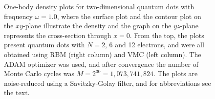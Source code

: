 \begin{figure}
	\caption{One-body density plots for two-dimensional quantum dots with frequency $\omega=1.0$, where the surface plot and the contour plot on the $xy$-plane illustrate the density and the graph on the $yz$-plane represents the cross-section through $x=0$. From the top, the plots present quantum dots with $N=2$, 6 and 12 electrons, and were all obtained using RBM (right column) and VMC (left column). The ADAM optimizer was used, and after convergence the number of Monte Carlo cycles was $M=2^{30}=1,073,741,824$. The plots are noise-reduced using a Savitzky-Golay filter, and for abbreviations see the text.}
	\label{fig:OB_interaction_1p0w1}
\end{figure}
\begin{figure}
	\centering
	\captionsetup[subfigure]{labelformat=empty}
	\hspace{0.1cm}
	\hspace{-0.0cm}
	\\
	

\end{figure}
